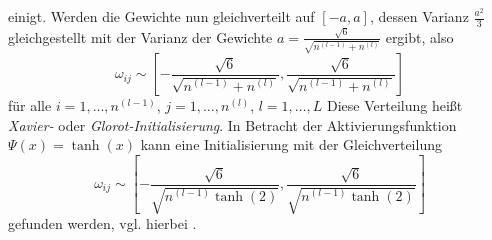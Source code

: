 einigt. Werden die Gewichte nun gleichverteilt auf $[-a,a]$, dessen Varianz $\frac{a^2}{3}$ gleichgestellt mit der
Varianz der Gewichte $a=\frac{\sqrt {6}}{\sqrt {n^{(l-1)} + n^{(l)}}}$ ergibt, also
\[
    \omega_{ij} \sim
    \left[ -\frac{\sqrt {6}}{\sqrt {n^{(l-1)} + n^{(l)}}}, \frac{\sqrt {6}}{\sqrt {n^{(l-1)} + n^{(l)}}} \right]
\]
für alle $i = 1, \dots, n^{(l-1)}$, $j=1,\dots,n^{(l)}$, $l=1,\dots,L$ Diese Verteilung heißt \textit{Xavier-} oder
\textit{Glorot-Initialisierung}. In Betracht der Aktivierungsfunktion $\Psi(x)=\tanh(x)$ kann eine Initialisierung mit der
Gleichverteilung
\[
    \omega_{ij} \sim
    \left[ -\frac{\sqrt {6}}{\sqrt {n^{(l-1)} \tanh(2)}}, \frac{\sqrt {6}}{\sqrt {n^{(l-1)} \tanh(2)}} \right]
\]
gefunden werden, vgl. hierbei \cite[27]{remcovandermeerSolvingPartialDifferential}.


